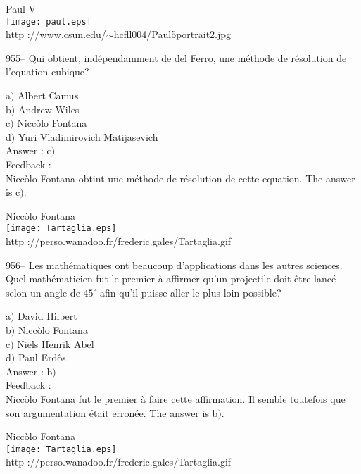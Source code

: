﻿\documentclass[letterpaper, 12pt]{article}
\begin{document}
        \begin{center}
        Paul V\\
    \texttt{[image: paul.eps]}\\
        {\footnotesize http
://www.csun.edu/$\sim$hcfll004/Paul5portrait2.jpg}
    \end{center}

955-- Qui obtient, ind\'ependamment de del Ferro, une m\'ethode de
r\'esolution de l'equation cubique?

a$)$ Albert Camus \\
b$)$ Andrew Wiles \\
c$)$ Nicc\`olo Fontana  \\
d$)$ Yuri Vladimirovich Matijasevich \\

Answer : c$)$\\

Feedback : \\
Nicc\`olo Fontana obtint une m\'ethode de r\'esolution de cette equation.
The answer is c$)$.\\

        \begin{center}
        Nicc\`olo Fontana\\
    \texttt{[image: Tartaglia.eps]}\\
        {\footnotesize http
://perso.wanadoo.fr/frederic.gales/Tartaglia.gif}
    \end{center}

956-- Les math\'ematiques ont beaucoup d'applications dans les
autres sciences. Quel math\'ematicien fut le premier \`a affirmer
qu'un projectile doit \^etre lanc\'e selon un angle de $45^{\circ}$
afin qu'il puisse aller le plus loin possible?

a$)$ David Hilbert \\
b$)$ Nicc\`olo Fontana  \\
c$)$ Niels Henrik Abel  \\
d$)$ Paul Erd\H{o}s\\

Answer : b$)$\\

Feedback : \\
Nicc\`olo Fontana fut le premier \`a faire cette affirmation. Il
semble toutefois que son
argumentation \'etait erron\'ee. The answer is b$)$.\\

        \begin{center}
        Nicc\`olo Fontana\\
    \texttt{[image: Tartaglia.eps]}\\
        {\footnotesize http
://perso.wanadoo.fr/frederic.gales/Tartaglia.gif}
    \end{center}
\end{document}
